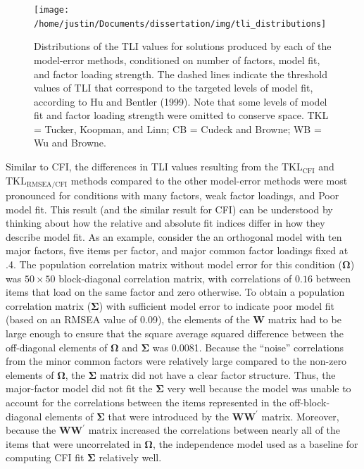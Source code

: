 \documentclass[11pt]{umnthesis}
\begin{document}
\begin{figure}

{\centering \texttt{[image: /home/justin/Documents/dissertation/img/tli\_distributions]} 

}

\caption[Distributions of the TLI values for solutions produced by each of the model-error methods, conditioned on number of factors, model fit, and factor loading strength]{Distributions of the TLI values for solutions produced by each of the model-error methods, conditioned on number of factors, model fit, and factor loading strength. The dashed lines indicate the threshold values of TLI that correspond to the targeted levels of model fit, according to Hu and Bentler (1999). Note that some levels of model fit and factor loading strength were omitted to conserve space. TKL = Tucker, Koopman, and Linn; CB = Cudeck and Browne; WB = Wu and Browne.}\label{fig:tli-distributions}
\end{figure}

Similar to CFI, the differences in TLI values resulting from the \(\textrm{TKL}_{\textrm{CFI}}\) and \(\textrm{TKL}_{\textrm{RMSEA/CFI}}\) methods compared to the other model-error methods were most pronounced for conditions with many factors, weak factor loadings, and Poor model fit. This result (and the similar result for CFI) can be understood by thinking about how the relative and absolute fit indices differ in how they describe model fit. As an example, consider the an orthogonal model with ten major factors, five items per factor, and major common factor loadings fixed at .4. The population correlation matrix without model error for this condition (\(\bm{\Omega}\)) was \(50 \times 50\) block-diagonal correlation matrix, with correlations of \(0.16\) between items that load on the same factor and zero otherwise. To obtain a population correlation matrix (\(\bm{\Sigma}\)) with sufficient model error to indicate poor model fit (based on an RMSEA value of 0.09), the elements of the \(\mathbf{W}\) matrix had to be large enough to ensure that the square average squared difference between the off-diagonal elements of \(\bm{\Omega}\) and \(\bm{\Sigma}\) was 0.0081. Because the ``noise'' correlations from the minor common factors were relatively large compared to the non-zero elements of \(\bm{\Omega}\), the \(\bm{\Sigma}\) matrix did not have a clear factor structure. Thus, the major-factor model did not fit the \(\bm{\Sigma}\) very well because the model was unable to account for the correlations between the items represented in the off-block-diagonal elements of \(\bm{\Sigma}\) that were introduced by the \(\mathbf{WW}^\prime\) matrix. Moreover, because the \(\mathbf{WW}^\prime\) matrix increased the correlations between nearly all of the items that were uncorrelated in \(\bm{\Omega}\), the independence model used as a baseline for computing CFI fit \(\bm{\Sigma}\) relatively well.
\end{document}
